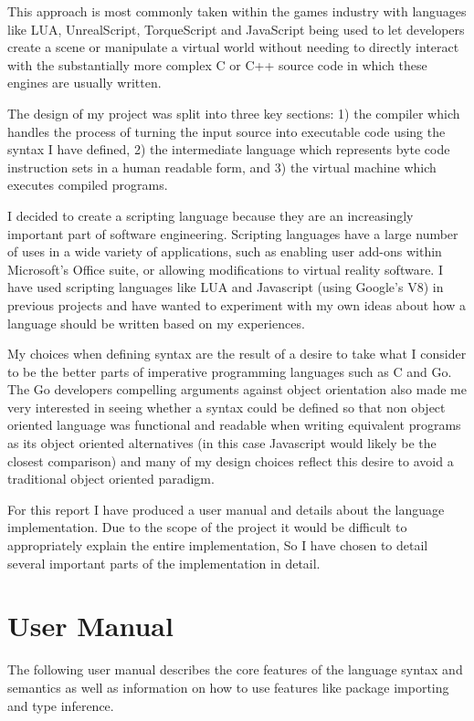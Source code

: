 \documentclass[]{final_report}
\begin{document}
This approach is most commonly taken within the games industry with languages like LUA, UnrealScript, TorqueScript and JavaScript being used to let developers create a scene or manipulate a virtual world without needing to directly interact with the substantially more complex C or C++ source code in which these engines are usually written.

The design of my project was split into three key sections: 1) the compiler which handles the process of turning the input source into executable code using the syntax I have defined, 2) the intermediate language which represents byte code instruction sets in a human readable form, and 3) the virtual machine which executes compiled programs.

I decided to create a scripting language because they are an increasingly important part of software engineering. Scripting languages have a large number of uses in a wide variety of applications, such as enabling user add-ons within Microsoft's Office suite, or allowing modifications to virtual reality software. I have used scripting languages like LUA and Javascript (using Google's V8) in previous projects and have wanted to experiment with my own ideas about how a language should be written based on my experiences. 

My choices when defining syntax are the result of a desire to take what I consider to be the better parts of imperative programming languages such as C and Go. The Go developers compelling arguments against object orientation also made me very interested in seeing whether a syntax could be defined so that non object oriented language was functional and readable when writing equivalent programs as its object oriented alternatives (in this case Javascript would likely be the closest comparison) and many of my design choices reflect this desire to avoid a traditional object oriented paradigm.

For this report I have produced a user manual and details about the language implementation. Due to the scope of the project it would be difficult to appropriately explain the entire implementation, So I have chosen to detail several important parts of the implementation in detail.

\chapter{User Manual}

The following user manual describes the core features of the language syntax and semantics as well as information on how to use features like package importing and type inference.
\end{document}
